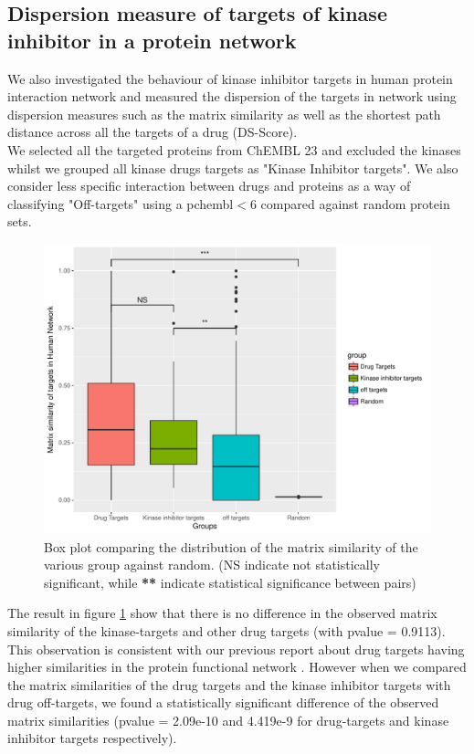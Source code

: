 \documentclass[a4paper, 11pt]{report}
\begin{document}
\subsection{Dispersion measure of targets of kinase inhibitor in a protein network}
We also investigated the behaviour of kinase inhibitor targets in human protein interaction network and measured the dispersion of the targets in network using dispersion measures such as the matrix similarity as well as the shortest path distance across all the targets of a drug (DS-Score).\\
We selected all the targeted proteins from ChEMBL 23 and excluded the kinases whilst we grouped all kinase drugs targets as "Kinase Inhibitor targets". We also consider less specific interaction between drugs and proteins as a way of classifying "Off-targets" using a pchembl$<$6 compared against random protein sets.
\begin{figure}[H]
	\includegraphics[width=\linewidth]{figures/simplotk.pdf}
	\centering
	\caption{Box plot comparing the distribution of the matrix similarity of the various group against random. (NS indicate not statistically significant, while \textbf{**} indicate statistical significance between pairs)}
		\label{ksim_targets}
\end{figure}
The result in figure \ref{ksim_targets} show that there is no difference in the observed matrix similarity of the kinase-targets and other drug targets (with pvalue = 0.9113). This observation is consistent with our previous report about drug targets having higher similarities in the protein functional network \cite{moya2017structural}. However when we compared the matrix similarities of the drug targets and the kinase inhibitor targets with drug off-targets, we found a statistically significant difference of the observed matrix similarities (pvalue = 2.09e-10 and 4.419e-9 for drug-targets and kinase inhibitor targets respectively).\par
\end{document}
